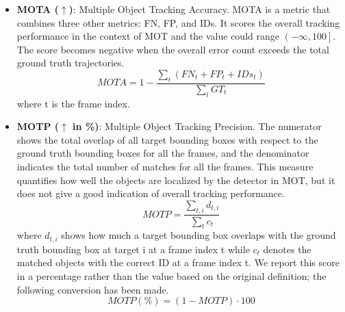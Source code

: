 \begin{itemize}
\item \textbf{MOTA ($\uparrow$)}: Multiple Object Tracking Accuracy. MOTA is a metric that combines three other metrics: FN, FP, and IDs. It scores the overall tracking performance in the context of MOT and the value could range $\left( -\infty, 100 \right]$. The score becomes negative when the overall error count exceeds the total ground truth trajectories.
\begin{equation}
MOTA = 1 - \frac{\sum_{t} (FN_{t} + FP_{t} + IDs_{t})}{\sum_{t}GT_{t}}
\label{eqn:MOTA}
\end{equation}
where t is the frame index.

\item \textbf{MOTP ($\uparrow$ in \%)}: Multiple Object Tracking Precision. The numerator shows the total overlap of all target bounding boxes with respect to the ground truth bounding boxes for all the frames, and the denominator indicates the total number of matches for all the frames. This measure quantifies how well the objects are localized by the detector in MOT, but it does not give a good indication of overall tracking performance.
\begin{equation} 
MOTP = \frac{\sum_{t,i} d_{t,i}}{\sum_{t}c_{t}}
\label{eqn:MOTP}
\end{equation}
where $d_{t,i}$ shows how much a target bounding box overlaps with the ground truth bounding box at target i at a frame index t while $c_{t}$ denotes the matched objects with the correct ID at a frame index t. We report this score in a percentage rather than the value based on the original definition; the following conversion has been made.
\begin{equation} 
MOTP (\%) = (1 - MOTP) \cdot 100
\label{eqn:MOTP_percentage}
\end{equation}

\end{itemize}


